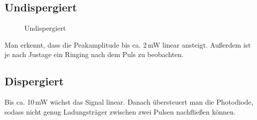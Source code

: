 \documentclass[bachelor,       %
               twoside,        %
               BCOR10mm,       %
               english,ngerman, %
               ]{GAUBM}
\begin{document}
\subsection{Undispergiert}
\begin{figure}[!htb]
	\centering
   \hfill
	\caption{Undispergiert}
	\label{fig:PDundisp}
\end{figure}
Man erkennt, dass die Peakamplitude bis ca. 2\,mW linear ansteigt.
Außerdem ist je nach Justage ein Ringing nach dem Puls zu beobachten.


\subsection{Dispergiert}
Bis ca. 10\,mW wächst das Signal linear.
Danach übersteuert man die Photodiode, sodass nicht genug Ladungsträger zwischen zwei Pulsen nachfließen können.
\end{document}
